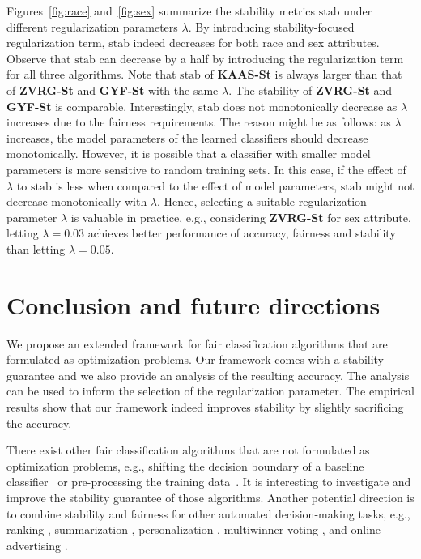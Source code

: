 \documentclass[11pt]{article}
\begin{document}
Figures~\ref{fig:race} and~\ref{fig:sex} summarize the stability metrics $\mathrm{stab}$ under different regularization parameters $\lambda$.
%
By introducing stability-focused regularization term, $\mathrm{stab}$ indeed decreases for both race and sex attributes.
%
Observe that $\mathrm{stab}$ can decrease by a half by introducing the regularization term for all three algorithms. 
%
Note that $\mathrm{stab}$ of \textbf{KAAS-St} is always larger than that of \textbf{ZVRG-St} and \textbf{GYF-St} with the same $\lambda$.
% 
The stability of \textbf{ZVRG-St} and \textbf{GYF-St} is comparable.
%
Interestingly, $\mathrm{stab}$ does not monotonically decrease as $\lambda$ increases due to the fairness requirements.
% 
The reason might be as follows: as $\lambda$ increases, the model parameters of the learned classifiers should decrease monotonically. 
%
However, it is possible that a classifier with smaller model parameters is more sensitive to random training sets. 
%
In this case, if the effect of $\lambda$ to $\mathrm{stab}$ is less when compared to the effect of model parameters, $\mathrm{stab}$ might not decrease monotonically with $\lambda$. 
% 
Hence, selecting a suitable regularization parameter $\lambda$ is valuable in practice, e.g., considering \textbf{ZVRG-St} for sex attribute, letting $\lambda=0.03$ achieves better performance of accuracy, fairness and stability than letting $\lambda = 0.05$.
%


	
	
	
	
		\section{Conclusion and future directions}
	\label{sec:conclusion}
	
	We propose an extended framework for fair classification algorithms that are formulated as optimization problems.
	Our framework comes with a stability guarantee and we also provide an analysis of the resulting accuracy.
	The analysis can be used to inform the selection of the regularization parameter.
	The empirical results show that our framework indeed improves stability by slightly sacrificing the accuracy.
	
	There exist other fair classification algorithms that are not formulated as optimization problems, e.g., shifting the decision boundary of a baseline classifier~\cite{fish2016confidence,hardt2016equality} or pre-processing the training data~\cite{feldman2015certifying,krasanakis2018adaptive}.
	It is interesting to investigate and improve the stability guarantee of those algorithms.
	Another potential direction is to combine stability and fairness for other automated decision-making tasks, e.g., ranking \cite{celis2018ranking,yang2017measuring}, summarization \cite{celis2018fair}, personalization \cite{celis2018an,celis2019algorithmic}, multiwinner voting \cite{celis2018multiwinner}, and online advertising \cite{celis2019online}.
	
\end{document}
